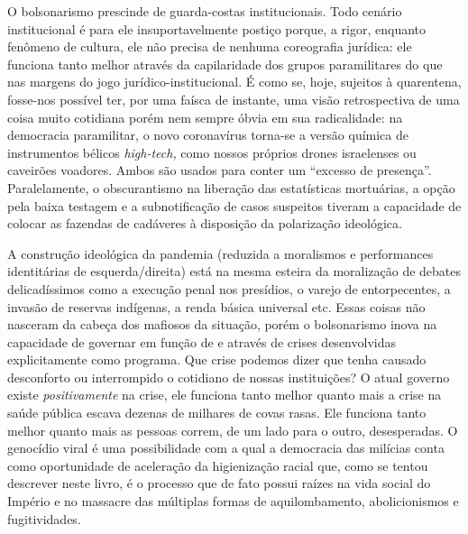 O bolsonarismo prescinde de guarda-costas institucionais. Todo cenário
institucional é para ele insuportavelmente postiço porque, a rigor,
enquanto fenômeno de cultura, ele não precisa de nenhuma coreografia
jurídica: ele funciona tanto melhor através da capilaridade dos grupos
paramilitares do que nas margens do jogo jurídico-institucional. É como
se, hoje, sujeitos à quarentena, fosse-nos possível ter, por uma faísca
de instante, uma visão retrospectiva de uma coisa muito cotidiana porém
nem sempre óbvia em sua radicalidade: na democracia paramilitar, o novo
coronavírus torna-se a versão química de instrumentos bélicos
\textit{high-tech,} como nossos próprios drones israelenses ou caveirões
voadores. Ambos são usados para conter um ``excesso de presença''.
Paralelamente, o obscurantismo na liberação das estatísticas mortuárias,
a opção pela baixa testagem e a subnotificação de casos suspeitos
tiveram a capacidade de colocar as fazendas de cadáveres à disposição da
polarização ideológica.~

A construção ideológica da pandemia (reduzida a moralismos e
performances identitárias de esquerda/direita) está na mesma esteira da
moralização de debates delicadíssimos como a execução penal nos
presídios, o varejo de entorpecentes, a invasão de reservas indígenas, a
renda básica universal etc. Essas coisas não nasceram da cabeça dos
mafiosos da situação, porém o bolsonarismo inova na capacidade de
governar em função de e através de crises desenvolvidas explicitamente
como programa. Que crise podemos dizer que tenha causado desconforto ou
interrompido o cotidiano de nossas instituições? O atual governo existe
\textit{positivamente} na crise, ele funciona tanto melhor quanto mais a
crise na saúde pública escava dezenas de milhares de covas rasas. Ele
funciona tanto melhor quanto mais as pessoas correm, de um lado para o
outro, desesperadas. O genocídio viral é uma possibilidade com a qual a
democracia das milícias conta como oportunidade de aceleração da
higienização racial que, como se tentou descrever neste livro, é o
processo que de fato possui raízes na vida social do Império e no
massacre das múltiplas formas de aquilombamento, abolicionismos e
fugitividades.~

